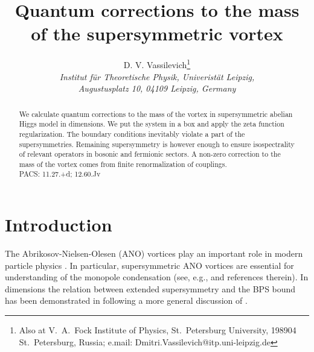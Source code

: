 \documentclass[a4paper,12pt]{article}
\begin{document}
\title{Quantum corrections to the mass of the supersymmetric vortex}
\author{D. V. Vassilevich\thanks{Also at V.~A.~Fock Institute of Physics,
St.~Petersburg University, 198904 St.~Petersburg, Russia; e.mail:
Dmitri.Vassilevich@itp.uni-leipzig.de}\\
{\it Institut f\"{u}r Theoretische Physik,
Univerist\"{a}t Leipzig,}\\{\it  Augustusplatz 10, 04109 Leipzig, Germany}}
\maketitle
\begin{abstract}
We calculate quantum corrections to the mass of the vortex in \coordHE{}
supersymmetric abelian Higgs model in \coordHE{} dimensions. We put the system
in a box and apply the zeta function regularization. The boundary conditions 
inevitably violate a part of the supersymmetries. Remaining supersymmetry
is however enough to ensure isospectrality of relevant operators in bosonic
and fermionic sectors. A non-zero correction to the mass of the vortex
comes from finite renormalization of couplings.\\
PACS: 11.27.+d; 12.60.Jv 
\end{abstract}
\section{Introduction}
The Abrikosov-Nielsen-Olesen (ANO) vortices \cite{ano} play an important
role in modern particle physics \cite{Achucarro:1999it}.
In particular, supersymmetric ANO vortices are essential for understanding
of the monopole condensation (see, e.g., \cite{Vainshtein:2000hu} and
references therein). In \coordHE{} dimensions the relation between extended
\coordHE{} supersymmetry and the BPS bound has been demonstrated in
\cite{Edelstein:bb} following a more general 
discussion of \cite{Hlousek:1991ej}. 
\end{document}
